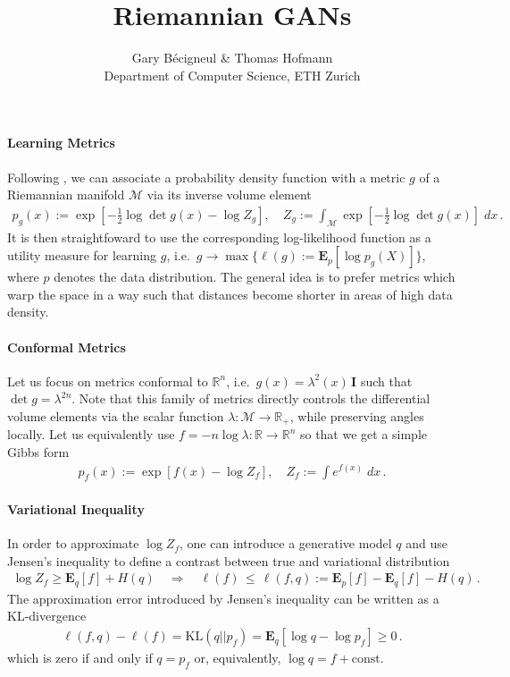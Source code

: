 \documentclass{article}
\title{
	Riemannian GANs
}
\author{
	Gary B\'ecigneul \& Thomas Hofmann \\[1mm] Department of Computer Science, ETH Zurich
}
\renewcommand{\Re}{{\mathbb R}}
\newcommand{\E}{{\mathbf E}}
\newcommand{\mI}{{\mathbf I}}
\begin{document}
\maketitle 


\paragraph{Learning Metrics} Following \cite{lebanon2002learning}, we can associate a probability density function with a metric $g$ of a Riemannian manifold $\mathcal M$ via its inverse volume element 
\begin{align}
p_g(x) := \exp\left[ - \frac 12 \log \det g(x) - \log Z_g \right], \quad Z_g:= \int_{\mathcal M}  \exp\left[ - \frac 12 \log \det g(x) \right]\; dx \,.
\end{align}
It is then straightfoward to use the corresponding log-likelihood function as a utility measure for learning $g$, i.e.~$g \rightarrow \max \{ \ell(g) :=  \E_p\left[ \log p_g(X) \right]\}$, where $p$ denotes the data distribution. The general idea is to prefer metrics which warp the space in a way such that distances become shorter in areas of high data density.


\paragraph{Conformal Metrics} Let us focus on metrics conformal to $\Re^n$, i.e.~$g(x) = \lambda^2(x) \, \mI$ such that  $\det g = \lambda^{2n}$. Note that this family of metrics directly controls the differential volume elements via the scalar function $\lambda: \mathcal M \to \Re_+$, while preserving angles locally.  Let us equivalently use  $f= -n \log \lambda: \Re \to \Re^n$ so that we get a simple Gibbs form
\begin{align}
p_f(x) := \exp\left[ f(x) - \log Z_f \right] , \quad Z_f := \int e^{f(x)} \; dx\,.
\end{align}

\paragraph{Variational Inequality} In order to approximate $\log Z_f$, one can introduce a generative model $q$ and use Jensen's inequality to define a contrast between true and variational distribution 
\begin{align}
\log Z_f \ge  \E_q\left[f\right]  + H(q) 
\quad  \Longrightarrow \quad  
\ell(f) \, \le \, \ell(f,q) :=  \E_p[f] -  \E_q\left[f\right]   - H(q) \,.
\label{eq:contrast}
\end{align}
%
The approximation error introduced by Jensen's inequality can be written as a KL-divergence 
\begin{align}
\ell(f,q) - \ell(f) = \text{KL}(q||p_f) = \E_q\left[ \log q - \log p_f \right]  \ge 0\, .
\end{align}
which is zero if and only if $q = p_f$ or, equivalently, $\log q = f + \text{const}$. \\
\end{document}
